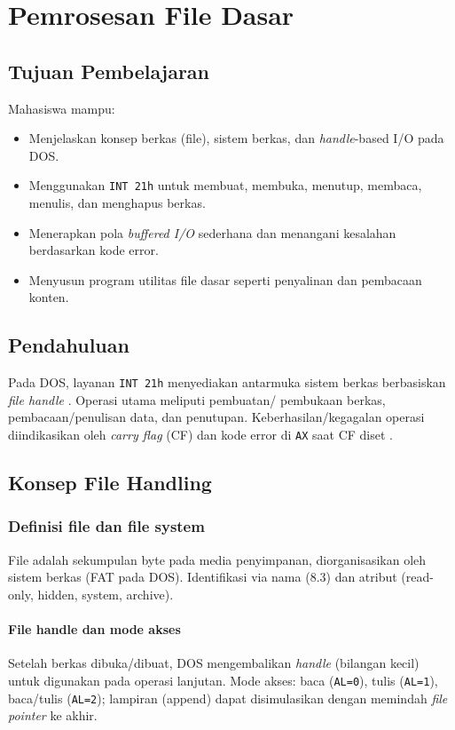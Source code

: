 \chapter{Pemrosesan File Dasar}

\section{Tujuan Pembelajaran}
Mahasiswa mampu:
\begin{itemize}
    \item Menjelaskan konsep berkas (file), sistem berkas, dan \textit{handle}-based I/O pada DOS.
    \item Menggunakan \texttt{INT 21h} untuk membuat, membuka, menutup, membaca, menulis, dan menghapus berkas.
    \item Menerapkan pola \textit{buffered I/O} sederhana dan menangani kesalahan berdasarkan kode error.
    \item Menyusun program utilitas file dasar seperti penyalinan dan pembacaan konten.
\end{itemize}

\section{Pendahuluan}
Pada DOS, layanan \texttt{INT 21h} menyediakan antarmuka sistem berkas berbasiskan \textit{file handle} \cite{susanto1995belajar}. Operasi utama meliputi pembuatan/ pembukaan berkas, pembacaan/penulisan data, dan penutupan. Keberhasilan/kegagalan operasi diindikasikan oleh \textit{carry flag} (CF) dan kode error di \texttt{AX} saat CF diset \cite{hyde2010art}.

\section{Konsep File Handling}
\subsection{Definisi file dan file system}
File adalah sekumpulan byte pada media penyimpanan, diorganisasikan oleh sistem berkas (FAT pada DOS). Identifikasi via nama (8.3) dan atribut (read-only, hidden, system, archive).

\subsubsection{File handle dan mode akses}
Setelah berkas dibuka/dibuat, DOS mengembalikan \textit{handle} (bilangan kecil) untuk digunakan pada operasi lanjutan. Mode akses: baca (\texttt{AL=0}), tulis (\texttt{AL=1}), baca/tulis (\texttt{AL=2}); lampiran (append) dapat disimulasikan dengan memindah \textit{file pointer} ke akhir.


